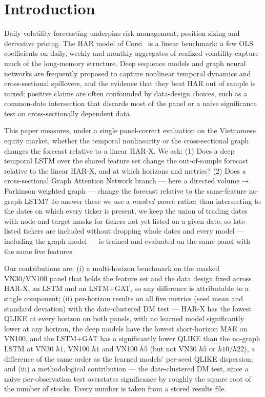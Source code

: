 \documentclass[runningheads]{llncs}
\begin{document}
\section{Introduction}
Daily volatility forecasting underpins risk management, position sizing and derivative pricing. The HAR model
of Corsi~\cite{corsi2009} is a linear benchmark: a few OLS coefficients on daily, weekly and monthly
aggregates of realized volatility capture much of the long-memory structure. Deep sequence models and graph
neural networks are frequently proposed to capture nonlinear temporal dynamics and cross-sectional spillovers,
and the evidence that they beat HAR out of sample is mixed; positive claims are often confounded by
data-design choices, such as a common-date intersection that discards most of the panel or a naive
significance test on cross-sectionally dependent data.

This paper measures, under a single panel-correct evaluation on the Vietnamese equity market, whether the
temporal nonlinearity or the cross-sectional graph changes the forecast relative to a linear HAR-X. We ask: (1)
Does a deep temporal LSTM over the shared feature set change the out-of-sample forecast relative to the linear
HAR-X, and at which horizons and metrics? (2) Does a cross-sectional Graph Attention Network branch --- here a
directed volume$\to$Parkinson weighted graph --- change the forecast relative to the same-feature no-graph
LSTM? To answer these we use a \emph{masked panel}: rather than intersecting to the dates on
which every ticker is present, we keep the union of trading dates with node and target masks for tickers not
yet listed on a given date, so late-listed tickers are included without dropping whole dates and every model
--- including the graph model --- is trained and evaluated on the same panel with the same five features.

Our contributions are: (i) a multi-horizon benchmark on the masked VN30/VN100 panel that holds
the feature set and the data design fixed across HAR-X, an LSTM and an LSTM+GAT, so any difference is
attributable to a single component; (ii) per-horizon results on all five metrics (seed mean and standard
deviation) with the date-clustered DM test --- HAR-X has the lowest QLIKE at every horizon on both panels, with
no learned model significantly lower at any horizon, the deep models have the lowest short-horizon MAE on
VN100, and the LSTM+GAT has a significantly lower QLIKE than the no-graph LSTM at VN30 $h1$, VN100 $h1$ and
VN100 $h5$ (but not VN30 $h5$ or $h10$/$h22$), a difference of the same order as the learned models' per-seed
QLIKE dispersion; and (iii) a methodological contribution --- the
date-clustered DM test, since a naive per-observation test overstates significance by roughly the square root of the number of stocks. Every number is taken from a stored results file.
\end{document}
